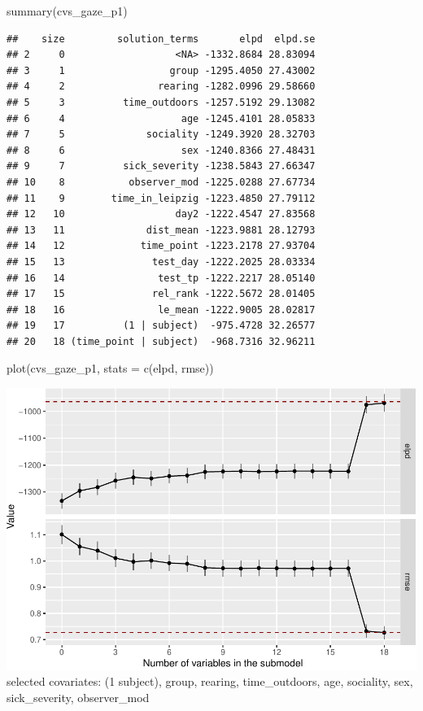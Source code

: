 \documentclass[
]{article}
\newenvironment{Shaded}{\begin{snugshade}}{\end{snugshade}}
\newcommand{\AttributeTok}[1]{\textcolor[rgb]{0.77,0.63,0.00}{#1}}
\newcommand{\FunctionTok}[1]{\textcolor[rgb]{0.00,0.00,0.00}{#1}}
\newcommand{\NormalTok}[1]{#1}
\newcommand{\StringTok}[1]{\textcolor[rgb]{0.31,0.60,0.02}{#1}}
\begin{document}
\begin{Shaded}
\begin{Highlighting}[]
\FunctionTok{summary}\NormalTok{(cvs\_gaze\_p1)}
\end{Highlighting}
\end{Shaded}

\begin{verbatim}
##    size         solution_terms       elpd  elpd.se
## 2     0                   <NA> -1332.8684 28.83094
## 3     1                  group -1295.4050 27.43002
## 4     2                rearing -1282.0996 29.58660
## 5     3          time_outdoors -1257.5192 29.13082
## 6     4                    age -1245.4101 28.05833
## 7     5              sociality -1249.3920 28.32703
## 8     6                    sex -1240.8366 27.48431
## 9     7          sick_severity -1238.5843 27.66347
## 10    8           observer_mod -1225.0288 27.67734
## 11    9        time_in_leipzig -1223.4850 27.79112
## 12   10                   day2 -1222.4547 27.83568
## 13   11              dist_mean -1223.9881 28.12793
## 14   12             time_point -1223.2178 27.93704
## 15   13               test_day -1222.2025 28.03334
## 16   14                test_tp -1222.2217 28.05140
## 17   15               rel_rank -1222.5672 28.01405
## 18   16                le_mean -1222.9005 28.02817
## 19   17          (1 | subject)  -975.4728 32.26577
## 20   18 (time_point | subject)  -968.7316 32.96211
\end{verbatim}

\begin{Shaded}
\begin{Highlighting}[]
\FunctionTok{plot}\NormalTok{(cvs\_gaze\_p1, }\AttributeTok{stats =} \FunctionTok{c}\NormalTok{(}\StringTok{\textquotesingle{}elpd\textquotesingle{}}\NormalTok{, }\StringTok{\textquotesingle{}rmse\textquotesingle{}}\NormalTok{))}
\end{Highlighting}
\end{Shaded}

\includegraphics{PPI_analysis_final_files/figure-latex/unnamed-chunk-16-1.pdf}
selected covariates: (1 \textbar{} subject), group, rearing, time\_outdoors, age, sociality, sex, sick\_severity, observer\_mod
\end{document}
